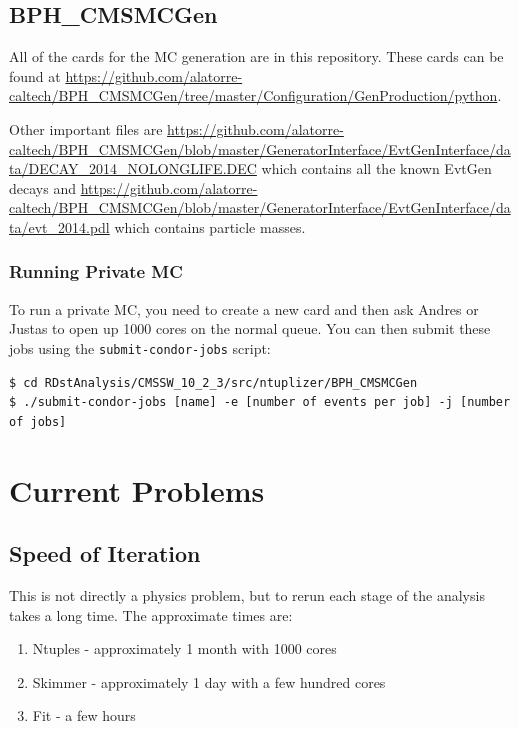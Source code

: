 \documentclass[12pt]{report}
\begin{document}
\section{BPH\_CMSMCGen}
All of the cards for the MC generation are in this repository. These cards can
be found at
\url{https://github.com/alatorre-caltech/BPH_CMSMCGen/tree/master/Configuration/GenProduction/python}.

Other important files are
\url{https://github.com/alatorre-caltech/BPH_CMSMCGen/blob/master/GeneratorInterface/EvtGenInterface/data/DECAY_2014_NOLONGLIFE.DEC}
which contains all the known EvtGen decays and
\url{https://github.com/alatorre-caltech/BPH_CMSMCGen/blob/master/GeneratorInterface/EvtGenInterface/data/evt_2014.pdl}
which contains particle masses.
\subsection{Running Private MC}
To run a private MC, you need to create a new card and then ask Andres or Justas to open up 1000 cores on the normal queue. You can then submit these jobs using the \texttt{submit-condor-jobs} script:
\begin{mdframed}[backgroundcolor=light-gray, roundcorner=10pt,leftmargin=1, rightmargin=1, innerleftmargin=15, innertopmargin=15,innerbottommargin=15, outerlinewidth=1, linecolor=light-gray,roundcorner=20pt]
\begin{lstlisting}
$ cd RDstAnalysis/CMSSW_10_2_3/src/ntuplizer/BPH_CMSMCGen
$ ./submit-condor-jobs [name] -e [number of events per job] -j [number of jobs]
\end{lstlisting}
\end{mdframed}

\chapter{Current Problems}
\section{Speed of Iteration}
This is not directly a physics problem, but to rerun each stage of the analysis takes a long time. The approximate times are:

\begin{enumerate}
\item Ntuples - approximately 1 month with 1000 cores
\item Skimmer - approximately 1 day with a few hundred cores
\item Fit - a few hours
\end{enumerate}
\end{document}
